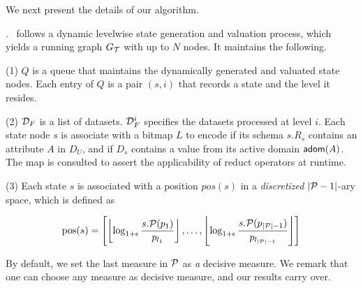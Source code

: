We next present the details of our algorithm. 

. 
~\apxmodis follows a dynamic 
levelwise state generation 
and valuation process, 
which yields
a running graph $G_\T$ 
with up to $N$  %
nodes. 
It %
maintains the following. 

\sstab 
(1) $Q$ is a queue that maintains 
the dynamically generated and 
valuated state nodes. 
Each entry of $Q$ is a pair 
$(s, i)$ that records 
a state and the level it resides. 


\sstab
(2) $\D_F$ is a list of datasets.  
$\D_F^i$ specifies the datasets 
processed at level $i$. 
Each state node $s$ is associate with a bitmap $L$ %
to encode if its schema $s.R_s$ 
contains an attribute $A$ in $D_U$, and if $D_s$ 
contains a value from its %
active domain $\ad(A)$. 
The map is consulted to assert the applicability of reduct operators at runtime. 

\sstab 
(3) Each state $s$ is associated with 
a position $pos(s)$ in a {\em discretized} $|\P-1|$-ary 
space, which is defined as 
\begin{small}
\begin{equation}
\operatorname{pos}(s) = 
\left[\left\lfloor\log _{1+\epsilon} \frac{s.\P(p_1)}{p_{l_1}}\right\rfloor, \ldots, \left\lfloor\log _{1+\epsilon} \frac{s.\P(p_{|\P|-1})}{p_{l_{|\P|-1}}}\right\rfloor\right]
\label{eq:pos}
\end{equation}
\end{small}

By default, we set the last measure 
in $\P$ as {\em a} decisive measure. 
We remark that one can choose 
any measure as decisive measure, 
and our results carry over. 

